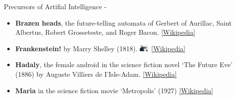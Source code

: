 \begin{frame}[t, allowframebreaks]{Precursors of Artifial Intelligence -}
    \begin{itemize}
        \small
        \item
        {\bf Brazen heads}, the future-telling automata of 
        Gerbert of Aurillac, Saint Albertus, Robert Grosseteste, 
        and Roger Bacon.
        \href{https://en.wikipedia.org/wiki/Brazen_head}{\tiny [Wikipedia]}\\
        \item
        {\bf Frankenstein!} by Marry Shelley (1818).
        \includegraphics[width=0.04\textwidth]{./images/precursors/stein.jpg}
        \href{https://en.wikipedia.org/wiki/Frankenstein}{\tiny [Wikipedia]}\\
        \item
        {\bf Hadaly}, the female android in the science fiction novel `The Future Eve' (1886)
        by Auguste Villiers de I'Isle-Adam.
        \href{https://en.wikipedia.org/wiki/The_Future_Eve}{\tiny [Wikipedia]}\\
        \item
        {\bf Maria} in the science fiction movie `Metropolis' (1927)
        \href{https://en.wikipedia.org/wiki/Metropolis_(1927_film)}{\tiny [Wikipedia]}\\
    \end{itemize}        

    \vspace{-0.3cm}


\end{frame}
